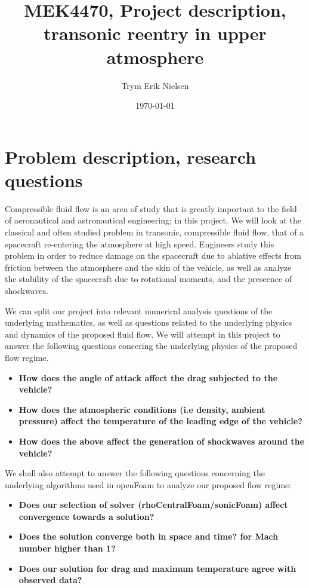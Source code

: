 \documentclass[10pt, oneside,english]{article}
\title{\vspace{-1cm} MEK4470, Project description, transonic reentry in upper atmosphere}
\author{Trym Erik Nielsen}
\affil[1]{Department of Mathematics}
\affil[ ]{University of Oslo}
\date{\today}
\begin{document}
\maketitle
\section{Problem description, research questions}

Compressible fluid flow is an area of study that is greatly important to the field of aeronautical and astronautical engineering; in this project. We will look at the classical and often studied problem in transonic, compressible fluid flow, that of a spacecraft re-entering the atmosphere at high speed. Engineers study this problem in order to reduce damage on the spacecraft due to ablative effects from friction between the atmosphere and the skin of the vehicle, as well as analyze the stability of the spacecraft due to rotational moments, and the preseence of shockwaves.  

We can split our project into relevant numerical analysis questions of the underlying mathematics, as well as questions related to the underlying physics and dynamics of the proposed fluid flow. We will attempt in this project to answer the following questions concering the underlying physics of the proposed flow regime. 

\begin{itemize}
\item \textbf{How does the angle of attack affect the drag subjected to the vehicle?}
\item \textbf{How does the atmospheric conditions (i.e density, ambient pressure) affect the temperature of the leading edge of the vehicle?}
\item \textbf{How does the above affect the generation of shockwaves around the vehicle?}
\end{itemize}

We shall also attempt to answer the following questions concerning the underlying algorithms used in openFoam to analyze our proposed flow regime:

\begin{itemize}
    \item  \textbf{Does our selection of solver (rhoCentralFoam/sonicFoam) affect convergence towards a solution?}
    \item  \textbf{Does the solution converge both in space and time? for Mach number higher than 1?}
    \item \textbf{Does our solution for drag and maximum temperature agree with observed data?}
\end{itemize}
\end{document}
